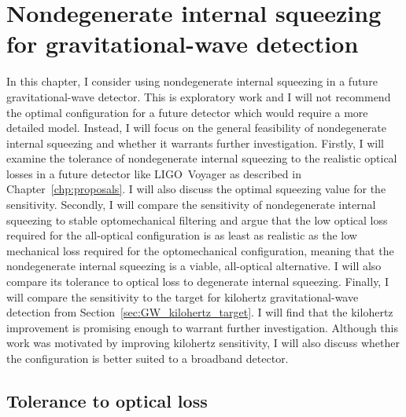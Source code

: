 \chapter{Nondegenerate internal squeezing for gravitational-wave detection}
\label{chp:science_case}


In this chapter, I consider using nondegenerate internal squeezing in a future gravitational-wave detector. This is exploratory work and I will not recommend the optimal configuration for a future detector which would require a more detailed model. Instead, I will focus on the general feasibility of nondegenerate internal squeezing and whether it warrants further investigation.
Firstly, I will examine the tolerance of nondegenerate internal squeezing to the realistic optical losses in a future detector like LIGO~Voyager as described in Chapter~\ref{chp:proposals}. I will also discuss the optimal squeezing value for the sensitivity. Secondly, I will compare the sensitivity of nondegenerate internal squeezing to stable optomechanical filtering and argue that the low optical loss required for the all-optical configuration is as least as realistic as the low mechanical loss required for the optomechanical configuration, meaning that the nondegenerate internal squeezing is a viable, all-optical alternative. I will also compare its tolerance to optical loss to degenerate internal squeezing. Finally, I will compare the sensitivity to the target for kilohertz gravitational-wave detection from Section~\ref{sec:GW_kilohertz_target}. I will find that the kilohertz improvement is promising enough to warrant further investigation. Although this work was motivated by improving kilohertz sensitivity, I will also discuss whether the configuration is better suited to a broadband detector. %

\section{Tolerance to optical loss}
\label{sec:nIS_tolerance_to_losses}

